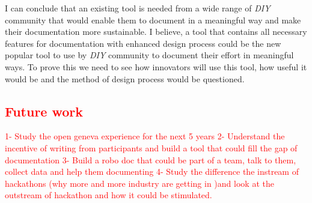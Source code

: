 I can conclude that an existing tool is needed from a wide range of \textit{DIY} community that would enable them to document in a meaningful way and make their documentation more sustainable. I believe, a tool that contains all necessary features for documentation with enhanced design process could be the new popular tool to use by \textit{DIY} community to document their effort in meaningful ways. To prove this we need to see how innovators will use this tool, how useful it would be and the method of design process would be questioned.


\textcolor{red}{
	\section{Future work}
	1- Study the open geneva experience for the next 5 years
	2- Understand the incentive of writing from participants and build a tool that could fill the gap of documentation
	3- Build a robo doc that could be part of a team, talk to them, collect data and help them documenting
	4- Study the difference  the instream of hackathons (why more and more industry are getting in )and look at the outstream of hackathon and how it could be stimulated.}